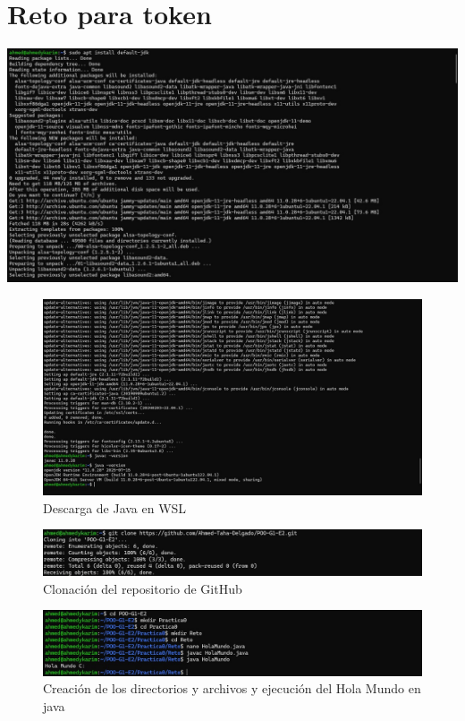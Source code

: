 \documentclass[letterpaper,12pt]{article}
\begin{document}
\section{Reto para token}


\begin{center}
    \includegraphics[width=14cm]{Imagenes/descarga1.jpeg}
\end{center}

\begin{figure}[H]
    \centering
    \includegraphics[width=14cm]{Imagenes/descarga2.jpg}
    \caption{Descarga de Java en WSL}
    \label{fig:java}
\end{figure}

\begin{figure}[H]
    \centering
    \includegraphics[width=14cm]{Imagenes/clonar.jpeg}
    \caption{Clonación del repositorio de GitHub}
    \label{fig:java}
\end{figure}

\begin{figure}[H]
    \centering
    \includegraphics[width=14cm]{Imagenes/creacion.jpeg}
    \caption{Creación de los directorios y archivos y ejecución del Hola Mundo en java}
    \label{fig:java}
\end{figure}
\end{document}
